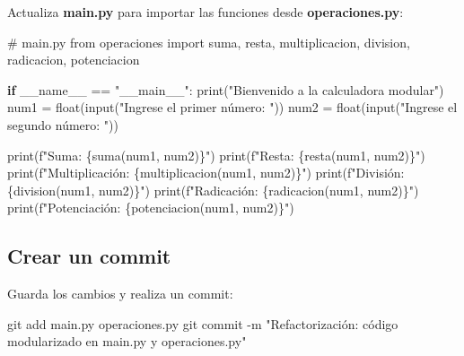 \documentclass[
  a4paper,
  DIV=11,
  numbers=noendperiod,
  onepage,
  openany]{scrreprt}
\newenvironment{Shaded}{\begin{snugshade}}{\end{snugshade}}
\newcommand{\AttributeTok}[1]{\textcolor[rgb]{0.40,0.45,0.13}{#1}}
\newcommand{\BuiltInTok}[1]{\textcolor[rgb]{0.00,0.23,0.31}{#1}}
\newcommand{\CommentTok}[1]{\textcolor[rgb]{0.37,0.37,0.37}{#1}}
\newcommand{\ControlFlowTok}[1]{\textcolor[rgb]{0.00,0.23,0.31}{\textbf{#1}}}
\newcommand{\FunctionTok}[1]{\textcolor[rgb]{0.28,0.35,0.67}{#1}}
\newcommand{\ImportTok}[1]{\textcolor[rgb]{0.00,0.46,0.62}{#1}}
\newcommand{\NormalTok}[1]{\textcolor[rgb]{0.00,0.23,0.31}{#1}}
\newcommand{\OperatorTok}[1]{\textcolor[rgb]{0.37,0.37,0.37}{#1}}
\newcommand{\SpecialCharTok}[1]{\textcolor[rgb]{0.37,0.37,0.37}{#1}}
\newcommand{\SpecialStringTok}[1]{\textcolor[rgb]{0.13,0.47,0.30}{#1}}
\newcommand{\StringTok}[1]{\textcolor[rgb]{0.13,0.47,0.30}{#1}}
\newcommand{\VariableTok}[1]{\textcolor[rgb]{0.07,0.07,0.07}{#1}}
\begin{document}
Actualiza \textbf{main.py} para importar las funciones desde
\textbf{operaciones.py}:

\begin{Shaded}
\begin{Highlighting}[]
\CommentTok{\# main.py}
\ImportTok{from}\NormalTok{ operaciones }\ImportTok{import}\NormalTok{ suma, resta, multiplicacion, division, radicacion, potenciacion}

\ControlFlowTok{if} \VariableTok{\_\_name\_\_} \OperatorTok{==} \StringTok{"\_\_main\_\_"}\NormalTok{:}
    \BuiltInTok{print}\NormalTok{(}\StringTok{"Bienvenido a la calculadora modular"}\NormalTok{)}
\NormalTok{    num1 }\OperatorTok{=} \BuiltInTok{float}\NormalTok{(}\BuiltInTok{input}\NormalTok{(}\StringTok{"Ingrese el primer número: "}\NormalTok{))}
\NormalTok{    num2 }\OperatorTok{=} \BuiltInTok{float}\NormalTok{(}\BuiltInTok{input}\NormalTok{(}\StringTok{"Ingrese el segundo número: "}\NormalTok{))}

    \BuiltInTok{print}\NormalTok{(}\SpecialStringTok{f"Suma: }\SpecialCharTok{\{}\NormalTok{suma(num1, num2)}\SpecialCharTok{\}}\SpecialStringTok{"}\NormalTok{)}
    \BuiltInTok{print}\NormalTok{(}\SpecialStringTok{f"Resta: }\SpecialCharTok{\{}\NormalTok{resta(num1, num2)}\SpecialCharTok{\}}\SpecialStringTok{"}\NormalTok{)}
    \BuiltInTok{print}\NormalTok{(}\SpecialStringTok{f"Multiplicación: }\SpecialCharTok{\{}\NormalTok{multiplicacion(num1, num2)}\SpecialCharTok{\}}\SpecialStringTok{"}\NormalTok{)}
    \BuiltInTok{print}\NormalTok{(}\SpecialStringTok{f"División: }\SpecialCharTok{\{}\NormalTok{division(num1, num2)}\SpecialCharTok{\}}\SpecialStringTok{"}\NormalTok{)}
    \BuiltInTok{print}\NormalTok{(}\SpecialStringTok{f"Radicación: }\SpecialCharTok{\{}\NormalTok{radicacion(num1, num2)}\SpecialCharTok{\}}\SpecialStringTok{"}\NormalTok{)}
    \BuiltInTok{print}\NormalTok{(}\SpecialStringTok{f"Potenciación: }\SpecialCharTok{\{}\NormalTok{potenciacion(num1, num2)}\SpecialCharTok{\}}\SpecialStringTok{"}\NormalTok{)}
\end{Highlighting}
\end{Shaded}

\subsection{Crear un commit}\label{crear-un-commit-2}

Guarda los cambios y realiza un commit:

\begin{Shaded}
\begin{Highlighting}[]
\FunctionTok{git}\NormalTok{ add main.py operaciones.py}
\FunctionTok{git}\NormalTok{ commit }\AttributeTok{{-}m} \StringTok{"Refactorización: código modularizado en main.py y operaciones.py"}
\end{Highlighting}
\end{Shaded}
\end{document}
